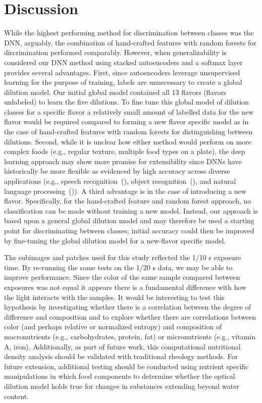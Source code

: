 \documentclass[authoryear]{elsarticle}
\begin{document}
\section{Discussion}
\label{sec:Discussion}
While the highest performing method for discrimination between classes was the DNN, arguably, the combination of hand-crafted features with random forests for discrimination performed comparably. However, when generalizability is considered our DNN method using stacked autoencoders and a softmax layer provides several advantages. First, since autoencoders leverage unsupervised learning for the purpose of training, labels are unnecessary to create a global dilution model. Our initial global model contained all 13 flavors (flavors unlabeled) to learn the five dilutions. To fine tune this global model of dilution classes for a specific flavor a relatively small amount of labelled data for the new flavor would be required compared to forming a new flavor specific model as in the case of hand-crafted features with random forests for distinguishing between dilutions. Second, while it is unclear how either method would perform on more complex foods (e.g., regular texture, multiple food types on a plate), the deep learning approach may show more promise for extensibility since DNNs have historically be more flexible as evidenced by high accuracy across diverse applications (e.g., speech recognition~(\cite{hinton2012, dahl2012, hannun2014}), object recognition~(\cite{krizhevsky2012, he2015, lecun2004, simonyan2014}), and natural language processing~(\cite{bengio2003, collobert2008})). A third advantage is in the case of introducing a new flavor. Specifically, for the hand-crafted feature and random forest approach, no classification can be made without training a new model. Instead, our approach is based upon a general global dilution model and may therefore be used a starting point for discriminating between classes; initial accuracy could then be improved by fine-tuning the global dilution model for a new-flavor specific model. 

The subimages and patches used for this study reflected the 1/10 s exposure time. By re-running the same tests on the 1/20 s data, we may be able to improve performance. Since the color of the same sample compared between exposures was not equal it appears there is a fundamental difference with how the light interacts with the samples. It would be interesting to test this hypothesis by investigating whether there is a correlation between the degree of difference and composition and to explore whether there are correlations between color (and perhaps relative or normalized entropy) and composition of macronutrients (e.g., carbohydrates, protein, fat) or micronutrients (e.g., vitamin A, iron). Additionally, as part of future work, this computational nutritional density analysis should be validated with traditional rheology methods. For future extension, additional testing should be conducted using nutrient specific manipulations in which food components to determine whether the optical dilution model holds true for changes in substances extending beyond water content.
\end{document}
